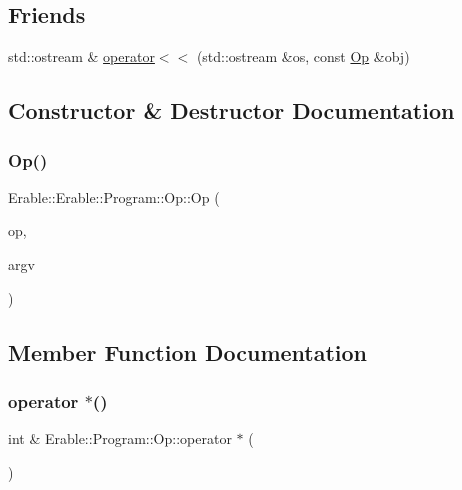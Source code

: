 \subsection*{Friends}
\begin{DoxyCompactItemize}
\item 
std\+::ostream \& \mbox{\hyperlink{struct_erable_1_1_erable_1_1_program_1_1_op_ac577f9dcecd6cf0e34570a6c7a45b381}{operator$<$$<$}} (std\+::ostream \&os, const \mbox{\hyperlink{struct_erable_1_1_erable_1_1_program_1_1_op}{Op}} \&obj)
\end{DoxyCompactItemize}


\subsection{Constructor \& Destructor Documentation}
\mbox{\label{struct_erable_1_1_erable_1_1_program_1_1_op_a7a9fae3ceee2da5fff7841237b1c142b}} 
\subsubsection{\texorpdfstring{Op()}{Op()}}
{\footnotesize\ttfamily Erable\+::\+Erable\+::\+Program\+::\+Op\+::\+Op (\begin{DoxyParamCaption}\item[{\mbox{\hyperlink{class_erable_1_1_op_code_element}{Op\+Code\+Element}}}]{op,  }\item[{std\+::vector$<$ int $>$}]{argv }\end{DoxyParamCaption})\hspace{0.3cm}{\ttfamily [inline]}}



\subsection{Member Function Documentation}
\mbox{\label{struct_erable_1_1_erable_1_1_program_1_1_op_a9c3a73f7dd366b448304ae652749af1c}} 
\subsubsection{\texorpdfstring{operator $\ast$()}{operator *()}\hspace{0.1cm}{\footnotesize\ttfamily [1/2]}}
{\footnotesize\ttfamily int \& Erable\+::\+Program\+::\+Op\+::operator $\ast$ (\begin{DoxyParamCaption}{ }\end{DoxyParamCaption})}

